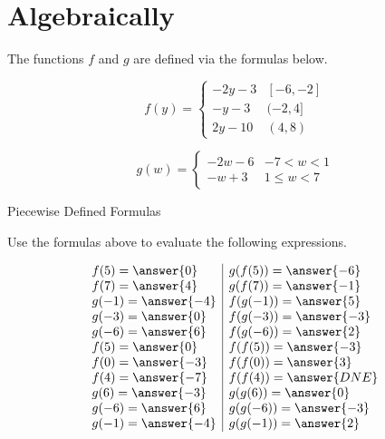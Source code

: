 \documentclass{ximera}
\begin{document}
\section{Algebraically}


The functions $f$ and $g$ are defined via the formulas below.






\[
f(y) = 
\begin{cases}
  -2y-3 &  [-6, -2]   \\
  -y-3 &  (-2, 4]  \\
  2y - 10 & (4,8)
\end{cases}
\]












\[
g(w) = 
\begin{cases}
  -2w-6 &   -7 < w < 1 \\
  -w+3 &  1 \leq w < 7
\end{cases}
\]












\begin{question} Piecewise Defined Formulas

Use the formulas above to evaluate the following expressions.



\[
\begin{array}{l|l}
f(5) = \answer{0}  & g(f(5)) = \answer{-6}   \\
f(7) = \answer{4}  & g(f(7)) = \answer{-1}   \\
g(-1) = \answer{-4}  & f(g(-1)) = \answer{5}   \\
g(-3) = \answer{0}  & f(g(-3)) = \answer{-3}   \\
g(-6) = \answer{6}  & f(g(-6)) = \answer{2}   \\
f(5) = \answer{0}  & f(f(5)) = \answer{-3}   \\
f(0) = \answer{-3}  & f(f(0)) = \answer{3}   \\
f(4) = \answer{-7}  & f(f(4)) = \answer{DNE}   \\
g(6) = \answer{-3}  & g(g(6)) = \answer{0}   \\
g(-6) = \answer{6}  & g(g(-6)) = \answer{-3}   \\
g(-1) = \answer{-4}  & g(g(-1)) = \answer{2}   \\
\end{array}
\]



\end{question}
\end{document}
